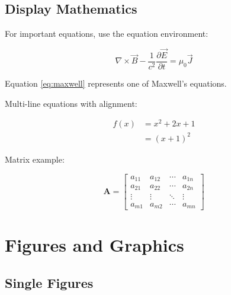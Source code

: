 \subsection{Display Mathematics}
\label{subsec:display_math}

For important equations, use the equation environment:

\begin{equation}
	\nabla \times \vec{B} - \frac{1}{c^2}\frac{\partial \vec{E}}{\partial t}
	= \mu_0 \vec{J}
	\label{eq:maxwell}
\end{equation}

Equation \eqref{eq:maxwell} represents one of Maxwell's equations.

Multi-line equations with alignment:

\begin{align}
	f(x) & = x^2 + 2x + 1 \label{eq:function} \\
	     & = (x + 1)^2 \label{eq:factored}
\end{align}

Matrix example:

\begin{equation}
	\mathbf{A} = \begin{bmatrix}
		a_{11} & a_{12} & \cdots & a_{1n} \\
		a_{21} & a_{22} & \cdots & a_{2n} \\
		\vdots & \vdots & \ddots & \vdots \\
		a_{m1} & a_{m2} & \cdots & a_{mn}
	\end{bmatrix}
	\label{eq:matrix}
\end{equation}

\section{Figures and Graphics}
\label{sec:figures}

\subsection{Single Figures}
\label{subsec:single_figures}

